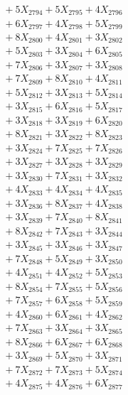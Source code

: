 \documentclass[a4paper,10pt]{article}
\begin{document}
{\begin{align}
&\;  + 5 X_{2794} + 5 X_{2795} + 4 X_{2796} \\[0.3ex]
&\;  + 6 X_{2797} + 4 X_{2798} + 5 X_{2799} \\[0.5ex]\allowbreak
&\;  + 8 X_{2800} + 4 X_{2801} + 3 X_{2802} \\[0.3ex]
&\;  + 5 X_{2803} + 3 X_{2804} + 6 X_{2805} \\[0.3ex]
&\;  + 7 X_{2806} + 3 X_{2807} + 3 X_{2808} \\[0.3ex]
&\;  + 7 X_{2809} + 8 X_{2810} + 4 X_{2811} \\[0.3ex]
&\;  + 5 X_{2812} + 3 X_{2813} + 5 X_{2814} \\[0.3ex]
&\;  + 3 X_{2815} + 6 X_{2816} + 5 X_{2817} \\[0.3ex]
&\;  + 3 X_{2818} + 3 X_{2819} + 6 X_{2820} \\[0.3ex]
&\;  + 8 X_{2821} + 3 X_{2822} + 8 X_{2823} \\[0.3ex]
&\;  + 3 X_{2824} + 7 X_{2825} + 7 X_{2826} \\[0.3ex]
&\;  + 3 X_{2827} + 3 X_{2828} + 3 X_{2829} \\[0.5ex]\allowbreak
&\;  + 3 X_{2830} + 7 X_{2831} + 3 X_{2832} \\[0.3ex]
&\;  + 4 X_{2833} + 4 X_{2834} + 4 X_{2835} \\[0.3ex]
&\;  + 3 X_{2836} + 8 X_{2837} + 4 X_{2838} \\[0.3ex]
&\;  + 3 X_{2839} + 7 X_{2840} + 8 X_{2841} \\[0.3ex]
&\;  + 8 X_{2842} + 7 X_{2843} + 3 X_{2844} \\[0.3ex]
&\;  + 3 X_{2845} + 3 X_{2846} + 3 X_{2847} \\[0.3ex]
&\;  + 7 X_{2848} + 5 X_{2849} + 3 X_{2850} \\[0.3ex]
&\;  + 4 X_{2851} + 4 X_{2852} + 5 X_{2853} \\[0.3ex]
&\;  + 8 X_{2854} + 7 X_{2855} + 5 X_{2856} \\[0.3ex]
&\;  + 7 X_{2857} + 6 X_{2858} + 5 X_{2859} \\[0.5ex]\allowbreak
&\;  + 4 X_{2860} + 6 X_{2861} + 4 X_{2862} \\[0.3ex]
&\;  + 7 X_{2863} + 3 X_{2864} + 3 X_{2865} \\[0.3ex]
&\;  + 8 X_{2866} + 6 X_{2867} + 6 X_{2868} \\[0.3ex]
&\;  + 3 X_{2869} + 5 X_{2870} + 3 X_{2871} \\[0.3ex]
&\;  + 7 X_{2872} + 7 X_{2873} + 5 X_{2874} \\[0.3ex]
&\;  + 4 X_{2875} + 4 X_{2876} + 6 X_{2877} \\[0.3ex]

\end{align}}
\end{document}

